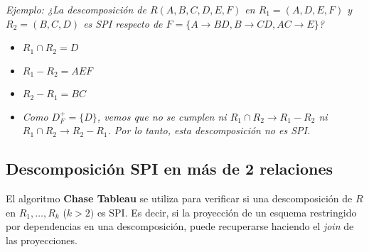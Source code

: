 \documentclass[a4paper, twoside]{article}
\begin{document}
\emph{Ejemplo: ¿La descomposición de $R(A,B,C,D,E,F)$ en $R_{1}=(A,D,E,F)$ y $R_{2}=(B,C,D)$ es SPI respecto de $F=\{A\to BD,B\to CD,AC\to E\}$?}
\begin{itemize}
	\item $R_{1}\cap R_{2}=D$
	\item $R_{1}-R_{2}=AEF$
	\item $R_{2}-R_{1}=BC$
	\item \emph{Como $D_{F}^{+}=\{D\}$, vemos que no se cumplen ni $R_{1}\cap R_{2}\to R_{1}-R_{2}$ ni $R_{1}\cap R_{2}\to R_{2}-R_{1}$. Por lo tanto, esta descomposición no es SPI.}
\end{itemize}

\subsection{Descomposición SPI en más de 2 relaciones}

El algoritmo \textbf{Chase Tableau} se utiliza para verificar si una descomposición de $R$ en $R_{1},\ldots,R_{k}$ ($k>2)$ es SPI. Es decir, si la proyección de un esquema restringido por dependencias en una descomposición, puede recuperarse haciendo el \emph{join} de las proyecciones.
\end{document}
